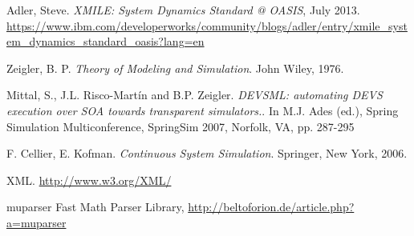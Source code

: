 \begin{thebibliography}{9}

  Adler, Steve. \textit{XMILE: System Dynamics Standard @ OASIS},
  July 2013.   \url{https://www.ibm.com/developerworks/community/blogs/adler/entry/xmile_system_dynamics_standard_oasis?lang=en}

  Zeigler, B. P. \textit{Theory of Modeling and Simulation}. John Wiley,
1976.

  Mittal, S., J.L. Risco-Martín and B.P. Zeigler. \textit{DEVSML: automating DEVS execution over SOA towards transparent simulators.}. In M.J. Ades (ed.), Spring Simulation Multiconference, SpringSim 2007, Norfolk, VA, pp. 287-295

F. Cellier, E. Kofman. \textit{Continuous System Simulation}. Springer, New York, 2006.

  XML. \url{http://www.w3.org/XML/}
  
 muparser Fast Math Parser Library, \url{http://beltoforion.de/article.php?a=muparser}



\end{thebibliography}